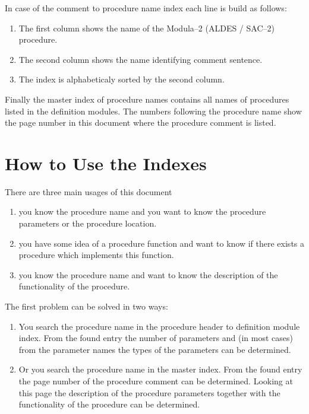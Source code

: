In case of the comment to procedure name index
each line is build as follows:
\begin{enumerate}
\item The first column shows the 
      name of the Modula--2 (ALDES / SAC--2) procedure. 
\item The second column shows the 
      name identifying comment sentence. 
\item The index is alphabeticaly sorted by the second column.
\end{enumerate}

Finally the master index of procedure names contains 
all names of procedures listed in the definition modules.
The numbers following the procedure name show the 
page number in this document where the procedure comment 
is listed. 


\section{How to Use the Indexes}

There are three main usages of this document 
\begin{enumerate}
\item you know the procedure name and you want to know 
      the procedure parameters or the procedure location.
\item you have some idea of a procedure function and 
      want to know if there exists a procedure which 
      implements this function.
\item you know the procedure name and want to know the 
      description of the functionality of the procedure.
\end{enumerate}

The first problem can be solved in two ways:
\begin{enumerate}
\item You search the procedure name in the 
      procedure header to definition module index. 
      From the found entry the number of parameters and 
      (in most cases) from the parameter names 
      the types of the parameters can be determined. 
\item Or you search the procedure name in the 
      master index. 
      From the found entry the page number of the 
      procedure comment can be determined. 
      Looking at this page the description of 
      the procedure parameters together with  
      the functionality of the procedure can be determined.
\end{enumerate}

